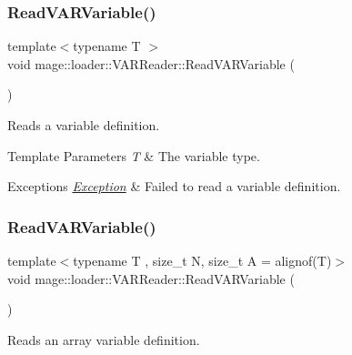 \subsubsection{\texorpdfstring{Read\+V\+A\+R\+Variable()}{ReadVARVariable()}\hspace{0.1cm}{\footnotesize\ttfamily [1/2]}}
{\footnotesize\ttfamily template$<$typename T $>$ \\
void mage\+::loader\+::\+V\+A\+R\+Reader\+::\+Read\+V\+A\+R\+Variable (\begin{DoxyParamCaption}{ }\end{DoxyParamCaption})\hspace{0.3cm}{\ttfamily [private]}}

Reads a variable definition.


\begin{DoxyTemplParams}{Template Parameters}
{\em T} & The variable type. \\
\hline
\end{DoxyTemplParams}

\begin{DoxyExceptions}{Exceptions}
{\em \mbox{\hyperlink{classmage_1_1_exception}{Exception}}} & Failed to read a variable definition. \\
\hline
\end{DoxyExceptions}
\mbox{\label{classmage_1_1loader_1_1_v_a_r_reader_aa27db2b3ba9c66dbdd2c75c6aba1848c}} 
\subsubsection{\texorpdfstring{Read\+V\+A\+R\+Variable()}{ReadVARVariable()}\hspace{0.1cm}{\footnotesize\ttfamily [2/2]}}
{\footnotesize\ttfamily template$<$typename T , size\+\_\+t N, size\+\_\+t A = alignof(\+T)$>$ \\
void mage\+::loader\+::\+V\+A\+R\+Reader\+::\+Read\+V\+A\+R\+Variable (\begin{DoxyParamCaption}{ }\end{DoxyParamCaption})\hspace{0.3cm}{\ttfamily [private]}}

Reads an array variable definition.


